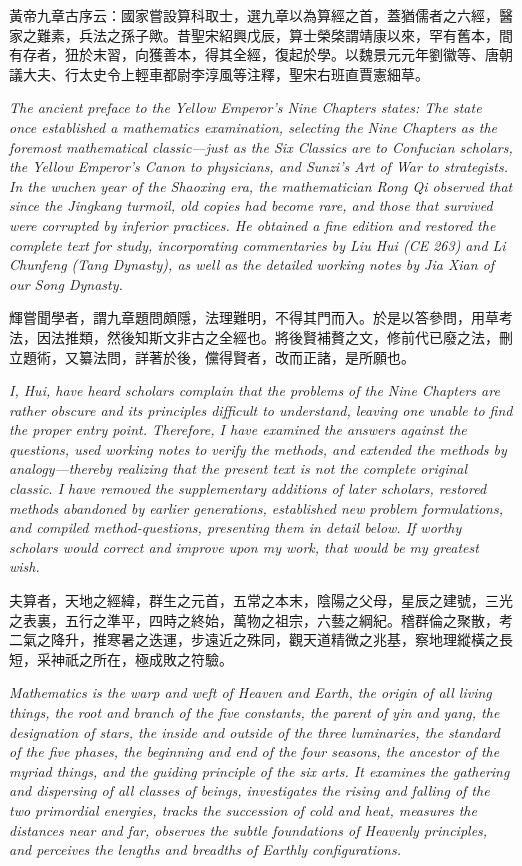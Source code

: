 \documentclass[10pt,a4paper]{article}
\newcommand{\bilingual}[2]{%
  \par\smallskip\noindent
  \begin{minipage}[t]{0.48\textwidth}
    \setlength{\parindent}{0pt}
    \setlength{\parskip}{4pt plus 1pt minus 1pt}
    #1
  \end{minipage}%
  \hfill
  \begin{minipage}[t]{0.48\textwidth}
    \setlength{\parindent}{0pt}
    \setlength{\parskip}{4pt plus 1pt minus 1pt}
    \small\textit{#2}%
  \end{minipage}
  \par\smallskip
}
\begin{document}
\bilingual{%
黃帝九章古序云：國家嘗設算科取士，選九章以為算經之首，蓋猶儒者之六經，醫家之難素，兵法之孫子歟。昔聖宋紹興戊辰，算士榮棨謂靖康以來，罕有舊本，間有存者，狃於末習，向獲善本，得其全經，復起於學。以魏景元元年劉徽等、唐朝議大夫、行太史令上輕車都尉李淳風等注釋，聖宋右班直賈憲細草。
}{%
The ancient preface to the \textit{Yellow Emperor's Nine Chapters} states: The state once established a mathematics examination, selecting the \textit{Nine Chapters} as the foremost mathematical classic---just as the Six Classics are to Confucian scholars, the \textit{Yellow Emperor's Canon} to physicians, and \textit{Sunzi's Art of War} to strategists. In the \textit{wuchen} year of the Shaoxing era, the mathematician Rong Qi observed that since the Jingkang turmoil, old copies had become rare, and those that survived were corrupted by inferior practices. He obtained a fine edition and restored the complete text for study, incorporating commentaries by Liu Hui (CE 263) and Li Chunfeng (Tang Dynasty), as well as the detailed working notes by Jia Xian of our Song Dynasty.
}

\bilingual{%
輝嘗聞學者，謂九章題問頗隱，法理難明，不得其門而入。於是以答參問，用草考法，因法推類，然後知斯文非古之全經也。將後賢補贅之文，修前代已廢之法，刪立題術，又纂法問，詳著於後，儻得賢者，改而正諸，是所願也。
}{%
I, Hui, have heard scholars complain that the problems of the \textit{Nine Chapters} are rather obscure and its principles difficult to understand, leaving one unable to find the proper entry point. Therefore, I have examined the answers against the questions, used working notes to verify the methods, and extended the methods by analogy---thereby realizing that the present text is not the complete original classic. I have removed the supplementary additions of later scholars, restored methods abandoned by earlier generations, established new problem formulations, and compiled method-questions, presenting them in detail below. If worthy scholars would correct and improve upon my work, that would be my greatest wish.
}

\bilingual{%
夫算者，天地之經緯，群生之元首，五常之本末，陰陽之父母，星辰之建號，三光之表裏，五行之準平，四時之終始，萬物之祖宗，六藝之綱紀。稽群倫之聚散，考二氣之降升，推寒暑之迭運，步遠近之殊同，觀天道精微之兆基，察地理縱橫之長短，采神祇之所在，極成敗之符驗。
}{%
Mathematics is the warp and weft of Heaven and Earth, the origin of all living things, the root and branch of the five constants, the parent of yin and yang, the designation of stars, the inside and outside of the three luminaries, the standard of the five phases, the beginning and end of the four seasons, the ancestor of the myriad things, and the guiding principle of the six arts. It examines the gathering and dispersing of all classes of beings, investigates the rising and falling of the two primordial energies, tracks the succession of cold and heat, measures the distances near and far, observes the subtle foundations of Heavenly principles, and perceives the lengths and breadths of Earthly configurations.
}
\end{document}
